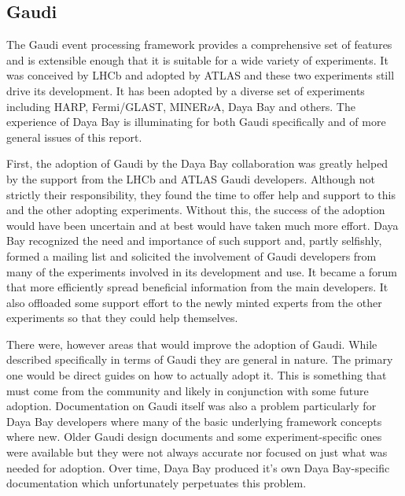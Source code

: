 
\subsection{Gaudi}

The Gaudi event processing framework provides a comprehensive set of
features and is extensible enough that it is suitable for a wide
variety of experiments.  It was conceived by LHCb and adopted by ATLAS
and these two experiments still drive its development.  It has been
adopted by a diverse set of experiments including HARP, Fermi/GLAST,
MINER$\nu$A, Daya Bay and others.  The experience of Daya Bay is
illuminating for both Gaudi specifically and of more general issues of
this report.

First, the adoption of Gaudi by the Daya Bay collaboration 
was greatly helped by the support from the LHCb
and ATLAS Gaudi developers.  Although not strictly their
responsibility, they found the time to offer help and support to this and the other
adopting experiments.  Without this, the success of the adoption would have been uncertain
and at best would have taken much more effort.  Daya Bay recognized
the need and importance of such support and, partly selfishly, formed
a mailing list\cite{gauditalk} and solicited the involvement of Gaudi developers from many
of the experiments involved in its development and use.  It became a forum that more efficiently spread
beneficial information from the main developers.  It also offloaded
some support effort to the newly minted experts from the other experiments so that they could help
themselves.

There were, however areas that would improve the adoption of Gaudi.
While described specifically in terms of Gaudi they are general in nature.
The primary one would be direct guides on how to actually adopt it.
This is something that must come from the community and likely in
conjunction with some future adoption.  Documentation on Gaudi itself
was also a problem particularly for Daya Bay developers where many of the basic
underlying framework concepts where new.  Older Gaudi design documents and
some experiment-specific ones were available but they were not always accurate
nor focused on just what was needed for adoption.  Over time, Daya Bay produced it's own
Daya Bay-specific documentation which unfortunately perpetuates this
problem.

